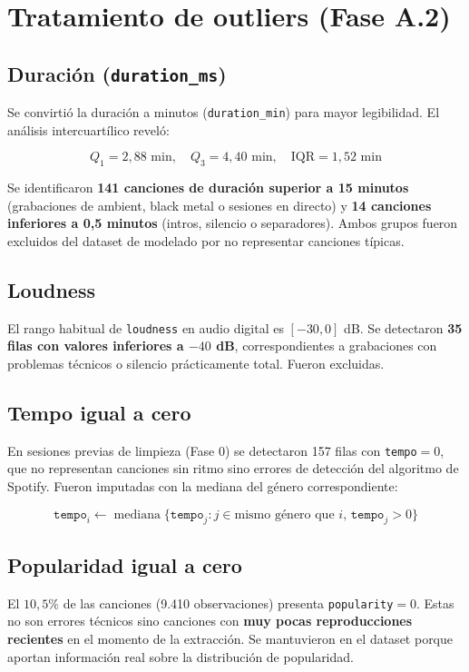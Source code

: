 \documentclass[12pt, a4paper, twoside]{book}
\theoremstyle{definition}
\begin{document}
\section{Tratamiento de outliers (Fase A.2)}

\subsection{Duración (\texttt{duration\_ms})}

Se convirtió la duración a minutos (\texttt{duration\_min}) para mayor
legibilidad. El análisis intercuartílico reveló:

$$Q_1 = 2{,}88 \text{ min}, \quad Q_3 = 4{,}40 \text{ min},
\quad \text{IQR} = 1{,}52 \text{ min}$$

Se identificaron \textbf{141 canciones de duración superior a 15 minutos}
(grabaciones de ambient, black metal o sesiones en directo) y \textbf{14 canciones
inferiores a 0{,}5 minutos} (intros, silencio o separadores). Ambos grupos fueron
excluidos del dataset de modelado por no representar canciones típicas.

\subsection{Loudness}

El rango habitual de \texttt{loudness} en audio digital es $[-30, 0]$ dB.
Se detectaron \textbf{35 filas con valores inferiores a $-40$ dB}, correspondientes
a grabaciones con problemas técnicos o silencio prácticamente total. Fueron excluidas.

\subsection{Tempo igual a cero}

En sesiones previas de limpieza (Fase 0) se detectaron 157 filas con
\texttt{tempo}$= 0$, que no representan canciones sin ritmo sino errores de
detección del algoritmo de Spotify. Fueron imputadas con la mediana del género
correspondiente:

$$\texttt{tempo}_i \leftarrow \operatorname{mediana}\{\texttt{tempo}_j : j
\in \text{mismo género que } i, \, \texttt{tempo}_j > 0\}$$

\subsection{Popularidad igual a cero}

El $10{,}5\%$ de las canciones (9.410 observaciones) presenta \texttt{popularity}$=0$.
Estas no son errores técnicos sino canciones con \textbf{muy pocas reproducciones
recientes} en el momento de la extracción. Se mantuvieron en el dataset porque
aportan información real sobre la distribución de popularidad.
\end{document}
